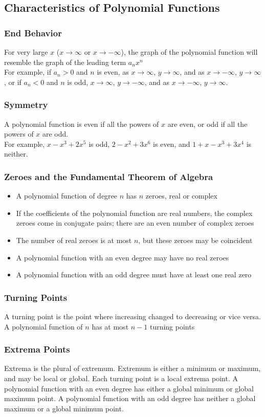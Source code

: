 \documentclass{article}
\begin{document}
	\subsection{Characteristics of Polynomial Functions}
	\subsubsection{End Behavior}
	For very large $x$ ($x\to\infty$ or $x\to-\infty$), the graph of the polynomial function will resemble the graph of the leading term $a_nx^n$\\
	For example, if $a_n>0$ and $n$ is even, as $x\to\infty$, $y\to\infty$, and as $x\to-\infty$, $y\to\infty$, or if $a_n<0$ and $n$ is odd, $x\to\infty$, $y\to-\infty$, and as $x\to-\infty$, $y\to\infty$.
	\subsubsection{Symmetry}
	A polynomial function is even if all the powers of $x$ are even, or odd if all the powers of $x$ are odd.\\
	For example, $x-x^3+2x^5$ is odd, $2-x^2+3x^6$ is even, and $1+x-x^3+3x^4$ is neither.
	\subsubsection{Zeroes and the Fundamental Theorem of Algebra}
	\begin{itemize}
		\item A polynomial function of degree $n$ has $n$ zeroes, real or complex
		\item If the coefficients of the polynomial function are real numbers, the complex zeroes come in conjugate pairs; there are an even number of complex zeroes
		\item The number of real zeroes is at most $n$, but these zeroes may be coincident
		\item A polynomial function with an even degree may have no real zeroes
		\item A polynomial function with an odd degree must have at least one real zero
	\end{itemize}
	\subsubsection{Turning Points}
	A turning point is the point where increasing changed to decreasing or vice versa. A polynomial function of $n$ has at most $n-1$ turning points
	\subsubsection{Extrema Points}
	Extrema is the plural of extremum. Extremum is either a minimum or maximum, and may be local or global. Each turning point is a local extrema point. A polynomial function with an even degree has either a global minimum or global maximum point. A polynomial function with an odd degree has neither a global maximum or a global minimum point.
\end{document}
